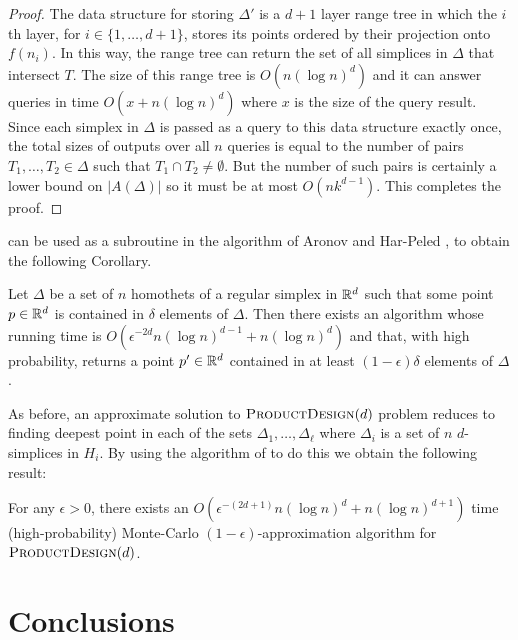 \documentclass[lotsofwhite]{patmorin}
\newcommand{\eps}{\epsilon}
\begin{document}
\begin{proof}
  The data structure for storing $\Delta'$ is a $d+1$ layer range tree
  \cite{b75} in which the $i$th layer, for $i\in\{1,\ldots,d+1\}$,
  stores its points ordered by their projection onto $f(n_i)$.  In this
  way, the range tree can return the set of all simplices in $\Delta$ that
  intersect $T$.  The size of this range tree is $O(n(\log n)^{d})$
  and it can answer queries in time $O(x+n(\log n)^{d})$ where $x$
  is the size of the query result.  Since each simplex in $\Delta$
  is passed as a query to this data structure exactly once, the total
  sizes of outputs over all $n$ queries is equal to the number of
  pairs $T_1,\ldots,T_2\in\Delta$ such that $T_1\cap T_2\neq\emptyset$.
  But the number of such pairs is certainly a lower bound on $|A(\Delta)|$
  so it must be at most $O(nk^{d-1})$.  This completes the proof.
\end{proof}

 can be used as a subroutine in the
algorithm of Aronov and Har-Peled \cite[Theorem~3.3]{ah08}, to obtain
the following Corollary.

\begin{cor}
  Let $\Delta$ be a set of $n$ homothets of a regular simplex in $\mathbb{R}^d$
  such that some point $p\in\mathbb{R}^d$ is contained in $\delta$ elements
  of $\Delta$.  Then there exists an algorithm whose running time is
  $O(\eps^{-2d}n(\log n)^{d-1} + n(\log n)^d)$ and that, with high
  probability, returns a point $p'\in\mathbb{R}^{d}$ contained in at least
  $(1-\eps)\delta$ elements of $\Delta$.
\end{cor}

As before, an approximate solution to $\textsc{ProductDesign}(d)$ problem
reduces to finding deepest point in each of the sets
$\Delta_1,\ldots,\Delta_\ell$ where $\Delta_i$ is a set of $n$
$d$-simplices in $H_i$.  By using the algorithm of  to
do this we obtain the following result:

\begin{thm}
  For any $\eps >0$, there exists an $O(\eps^{-(2d+1)}n(\log n)^d + n(\log
  n)^{d+1})$ time (high-probability) Monte-Carlo $(1-\eps)$-approximation
  algorithm for $\textsc{ProductDesign}(d)$.
\end{thm}

\section{Conclusions}
\end{document}
